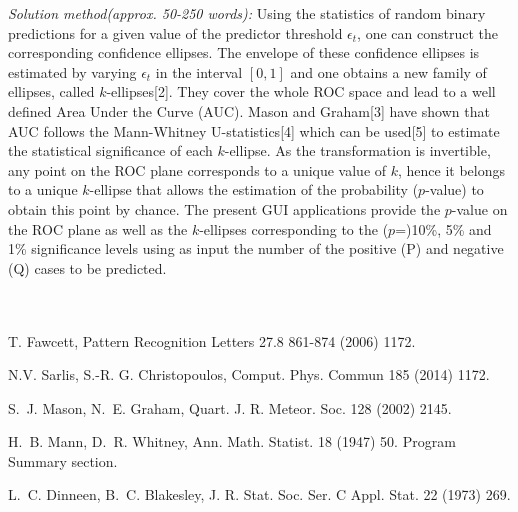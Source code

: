 \documentclass[preprint,12pt]{elsarticle}
\begin{document}
\begin{small}
{\em Solution method(approx. 50-250 words):} Using the statistics of random binary predictions for a given value of the predictor threshold $\epsilon_t$, one can construct the corresponding confidence ellipses. The envelope of these confidence ellipses is estimated by varying $\epsilon_t$ in the interval $[0,1]$ and one obtains a new family of ellipses, called $k$-ellipses[2]. They cover the whole ROC space and lead to a well defined Area Under the Curve (AUC). Mason and Graham[3] have shown that AUC follows the Mann-Whitney U-statistics[4] which can be used[5] to estimate the statistical significance of each $k$-ellipse. As the transformation is invertible, any point on the ROC plane corresponds to a unique value of $k$, hence it belongs to a unique $k$-ellipse that allows the estimation of the probability ($p$-value) to obtain this point by chance. The present GUI applications provide the $p$-value on the ROC plane as well as the $k$-ellipses corresponding to the ($p$=)10\%, 5\% and 1\% significance levels using as input the number of the positive (P) and negative (Q) cases to be predicted.\\\\
   \\

\begin{thebibliography}{0}
 T. Fawcett, Pattern Recognition Letters 27.8 861-874 (2006)
1172.

 N.V. Sarlis, S.-R. G. Christopoulos, Comput. Phys. Commun 185 (2014)
1172.

 S.~J. Mason, N.~E. Graham, Quart. J. R. Meteor. Soc. 128 (2002)
2145.          %
            
H.~B. Mann, D.~R. Whitney, Ann. Math. Statist. 18 (1947) 50.      %
Program Summary section.   

L.~C. Dinneen,  B.~C. Blakesley, J. R. Stat. Soc. Ser. C Appl. Stat.
22 (1973) 269.        %
\end{thebibliography}

\end{small}
\end{document}
